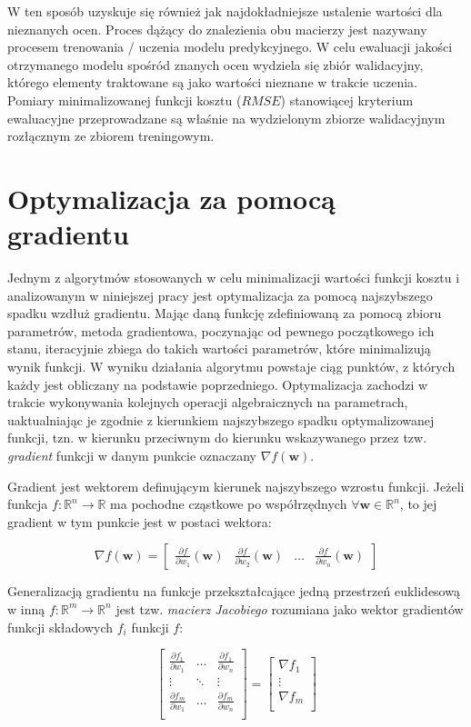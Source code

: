 \documentclass{pracamgr}
\begin{document}
W ten sposób uzyskuje się również jak najdokładniejsze ustalenie wartości dla nieznanych ocen. Proces dążący do znalezienia obu macierzy jest nazywany procesem trenowania / uczenia modelu predykcyjnego. W celu ewaluacji jakości otrzymanego modelu spośród znanych ocen wydziela się zbiór walidacyjny, którego elementy traktowane są jako wartości nieznane w trakcie uczenia. Pomiary minimalizowanej funkcji kosztu ($RMSE$) stanowiącej kryterium ewaluacyjne przeprowadzane są właśnie na wydzielonym zbiorze walidacyjnym rozłącznym ze zbiorem treningowym.

\section{Optymalizacja za pomocą gradientu}
Jednym z algorytmów stosowanych w celu minimalizacji wartości funkcji kosztu i analizowanym w niniejszej pracy jest optymalizacja za pomocą najszybszego spadku wzdłuż gradientu. Mając daną funkcję zdefiniowaną za pomocą zbioru parametrów, metoda gradientowa, poczynając od pewnego początkowego ich stanu, iteracyjnie zbiega do takich wartości parametrów, które minimalizują wynik funkcji. W wyniku działania algorytmu powstaje ciąg punktów, z których każdy jest obliczany na podstawie poprzedniego. Optymalizacja zachodzi w trakcie wykonywania kolejnych operacji algebraicznych na parametrach, uaktualniając je zgodnie z kierunkiem najszybszego spadku optymalizowanej funkcji, tzn. w kierunku przeciwnym do kierunku wskazywanego przez tzw. \textit{gradient} funkcji w danym punkcie oznaczany $\nabla f(\mathbf{w})$. 

Gradient jest wektorem definującym kierunek najszybszego wzrostu funkcji.
Jeżeli funkcja $f: \mathbb{R}^n \rightarrow \mathbb{R}$ ma pochodne cząstkowe po współrzędnych $\forall \mathbf{w} \in \mathbb{R}^n$, to jej gradient w tym punkcie jest w postaci wektora:

\[
\nabla f(\mathbf{w}) = \begin{bmatrix} \frac{\partial f}{\partial w_1} (\mathbf{w}) & \frac{\partial f}{\partial w_2} (\mathbf{w}) & \ldots & \frac{\partial f}{\partial w_n} (\mathbf{w}) \end{bmatrix}
\]

Generalizacją gradientu na funkcje przekształcające jedną przestrzeń euklidesową w inną $f: \mathbb{R}^m \rightarrow \mathbb{R}^n$ jest tzw. \textit{macierz Jacobiego} rozumiana jako wektor gradientów funkcji składowych $f_i$ funkcji $f$:

\[
\begin{bmatrix}
\frac{\partial f_1}{\partial w_1} & \ldots & \frac{\partial f_1}{\partial w_n} \\
\vdots & \ddots & \vdots \\
\frac{\partial f_m}{\partial w_1} & \ldots & \frac{\partial f_m}{\partial w_n} \\
\end{bmatrix} =
\begin{bmatrix}
\nabla f_1 \\ \vdots \\ \nabla f_m \\
\end{bmatrix}
\]
\end{document}
